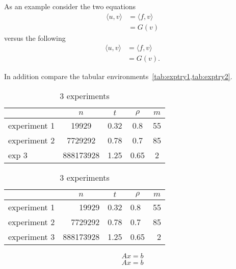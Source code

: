\documentclass[10pt]{article}
\begin{document}
As an example consider the two equations
%
\begin{align}
  \langle u, v \rangle & = \langle f, v\rangle\\
                       & = G(v)
\end{align}
%
versus the following
%
\begin{align}
\langle u, v \rangle & =
\langle f, v\rangle\\
& = G(v).
\end{align}

In addition compare the tabular environments~\cref{tab:exptry1,tab:exptry2}.
%
\begin{table}[!ht]
  \centering
  \begin{tabular}{|l||c|c|c|c|}
    \hline
& $n$ &$t$& $\rho$ & $m$\\
    \hline
    \hline
experiment 1 & 19929  & 0.32 & 0.8 & 55\\
    \hline
    experiment 2 &  7729292      & 0.78       & 0.7 & 85\\
    \hline
  exp 3         & 888173928 & 1.25 & 0.65 & 2\\
    \hline
  \end{tabular}
  \caption{3 experiments}\label{tab:exptry1}
\end{table}
%
\begin{table}[!ht]
  \centering
  \begin{tabular}{lrllr}
  \toprule
                 & \multicolumn{1}{c}{$n$}
                 & \multicolumn{1}{c}{$t$}
                 & \multicolumn{1}{c}{$\rho$}
                 & \multicolumn{1}{c}{$m$} \\
  \midrule
    experiment 1 & \num{    19929} & 0.32 & 0.8    & 55  \\
    experiment 2 & \num{  7729292} & 0.78 & 0.7    & 85  \\
    experiment 3 & \num{888173928} & 1.25 & 0.65   & 2   \\
  \bottomrule
  \end{tabular}
  \caption{3 experiments}\label{tab:exptry2}
\end{table}

\lipsum[1-1]
%
\begin{equation}
  A x = b
\end{equation}
%
\lipsum[2-2]
%
\begin{align}
  A x = b
\end{align}
%
\lipsum[3-3]
\end{document}
